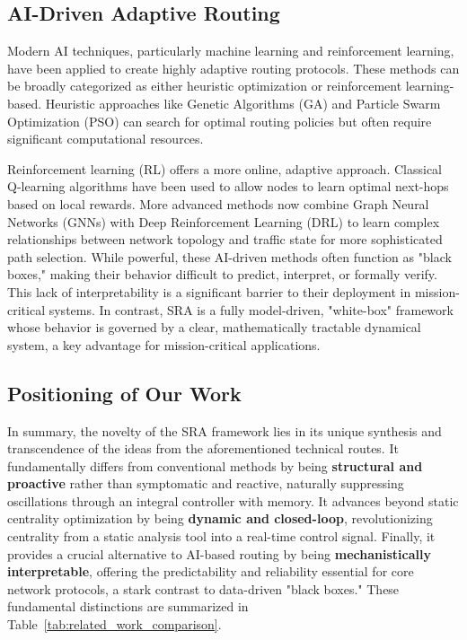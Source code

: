 \documentclass[journal]{IEEEtran}
\begin{document}
\subsection{AI-Driven Adaptive Routing}
Modern AI techniques, particularly machine learning and reinforcement learning, have been applied to create highly adaptive routing protocols. These methods can be broadly categorized as either heuristic optimization or reinforcement learning-based. Heuristic approaches like Genetic Algorithms (GA) \cite{2} and Particle Swarm Optimization (PSO) \cite{10, 16} can search for optimal routing policies but often require significant computational resources.

Reinforcement learning (RL) offers a more online, adaptive approach. Classical Q-learning algorithms \cite{15} have been used to allow nodes to learn optimal next-hops based on local rewards. More advanced methods now combine Graph Neural Networks (GNNs) with Deep Reinforcement Learning (DRL) \cite{3, 5} to learn complex relationships between network topology and traffic state for more sophisticated path selection. While powerful, these AI-driven methods often function as "black boxes," making their behavior difficult to predict, interpret, or formally verify. This lack of interpretability is a significant barrier to their deployment in mission-critical systems. In contrast, SRA is a fully model-driven, "white-box" framework whose behavior is governed by a clear, mathematically tractable dynamical system, a key advantage for mission-critical applications.

\subsection{Positioning of Our Work}
\label{subsec:positioning}

In summary, the novelty of the SRA framework lies in its unique synthesis and transcendence of the ideas from the aforementioned technical routes. It fundamentally differs from conventional methods by being \textbf{structural and proactive} rather than symptomatic and reactive, naturally suppressing oscillations through an integral controller with memory. It advances beyond static centrality optimization by being \textbf{dynamic and closed-loop}, revolutionizing centrality from a static analysis tool into a real-time control signal. Finally, it provides a crucial alternative to AI-based routing by being \textbf{mechanistically interpretable}, offering the predictability and reliability essential for core network protocols, a stark contrast to data-driven "black boxes." These fundamental distinctions are summarized in Table~\ref{tab:related_work_comparison}.
\end{document}
